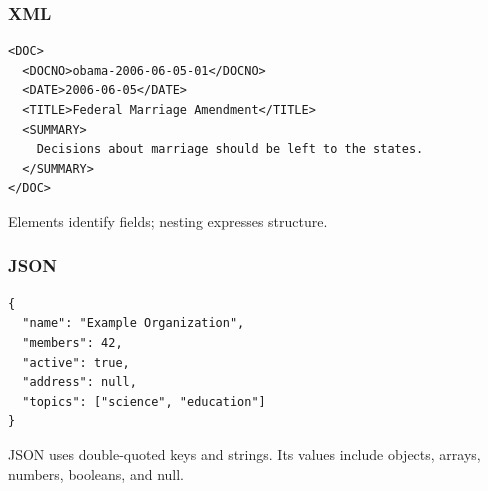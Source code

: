 \documentclass[compress, black]{beamer}
\begin{document}
\begin{frame}[fragile]
\frametitle{XML}
\begin{verbatim}
<DOC>
  <DOCNO>obama-2006-06-05-01</DOCNO>
  <DATE>2006-06-05</DATE>
  <TITLE>Federal Marriage Amendment</TITLE>
  <SUMMARY>
    Decisions about marriage should be left to the states.
  </SUMMARY>
</DOC>
\end{verbatim}
Elements identify fields; nesting expresses structure.
\end{frame}

\begin{frame}[fragile]
\frametitle{JSON}
\begin{verbatim}
{
  "name": "Example Organization",
  "members": 42,
  "active": true,
  "address": null,
  "topics": ["science", "education"]
}
\end{verbatim}
JSON uses double-quoted keys and strings. Its values include objects, arrays, numbers, booleans, and null.
\end{frame}

\end{document}
